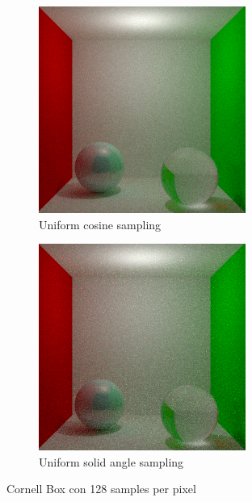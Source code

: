 \documentclass{article}
\begin{document}
\begin{figure}
\begin{subfigure}[h]{0.4\linewidth}
\includegraphics[width=\linewidth]{imgs/cosine_box128.png}
\caption{Uniform cosine sampling}
\end{subfigure}
\hfill
\begin{subfigure}[h]{0.4\linewidth}
\includegraphics[width=\linewidth]{imgs/solid_angle_box128.png}
\caption{Uniform solid angle sampling}
\end{subfigure}%
\caption{Cornell Box con 128 samples per pixel}
\end{figure}
\end{document}
